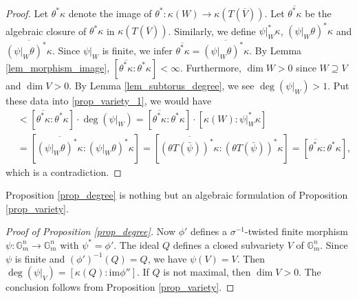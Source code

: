 \documentclass[12pt]{amsart}
\theoremstyle{plain}
\theoremstyle{definition}
\theoremstyle{question}
\theoremstyle{remark}
\theoremstyle{assumption}
\numberwithin{equation}{section}
\theoremstyle{bigthm}
\begin{document}
\begin{proof}
Let $\theta^{*} \kappa$ denote the image of $\theta^{*} \colon  \kappa (W) \rightarrow \kappa (T(\overline{V}))$. Let $\overline{\theta^{*} \kappa}$ be the algebraic closure of $\theta^{*} \kappa$ in $\kappa (T(\overline{V}))$. Similarly, we define $\psi|_{W}^{*} \kappa$, $(\psi|_{W} \theta)^{*} \kappa$ and $\overline{(\psi|_{W} \theta)^{*} \kappa}$. Since $\psi|_{W}$ is finite, we infer $\overline{\theta^{*} \kappa} = \overline{(\psi|_{W} \theta)^{*} \kappa}$. By Lemma \ref{lem_morphism_image}, $[\overline{\theta^{*} \kappa}: \theta^{*} \kappa] < \infty$. Furthermore, $\dim W >0$ since $W \supseteq V$ and $\dim V >0$. By Lemma \ref{lem_subtorus_degree}, we see $\deg(\psi|_{W}) >1$. Put these data into \eqref{prop_variety_1}, we would have
\begin{align*}
[\overline{\theta^{*} \kappa}: \theta^{*} \kappa] & < [\overline{\theta^{*} \kappa}: \theta^{*} \kappa] \cdot \deg(\psi|_{W}) = [\overline{\theta^{*} \kappa}: \theta^{*} \kappa] \cdot [\kappa (W): \psi|_{W}^{*} \kappa] \\
& = [\overline{(\psi|_{W} \theta)^{*} \kappa}: (\psi|_{W} \theta)^{*} \kappa] = [\overline{(\theta T(\bar{\psi}))^{*} \kappa} : (\theta T(\bar{\psi}))^{*} \kappa] = [\overline{\theta^{*} \kappa}: \theta^{*} \kappa],
\end{align*}
which is a contradiction.
\end{proof}

Proposition \ref{prop_degree} is nothing but an algebraic formulation of Proposition \ref{prop_variety}.
\begin{proof}[Proof of Proposition \ref{prop_degree}]
Now $\phi'$ defines a $\sigma^{-1}$-twisted finite morphism $\psi \colon  \mathbb{G}_{m}^{n} \rightarrow \mathbb{G}_{m}^{n}$ with $\psi^{*} = \phi'$. The ideal $Q$ defines a closed subvariety $V$ of $\mathbb{G}_{m}^{n}$. Since $\psi$ is finite and $(\phi')^{-1} (Q) = Q$, we have $\psi (V) = V$. Then $\deg (\psi|_{V}) = [\kappa (Q): \mathrm{im} \phi'']$. If $Q$ is  not maximal, then $\dim V >0$. The conclusion follows from Proposition \ref{prop_variety}.
\end{proof}

\end{document}
